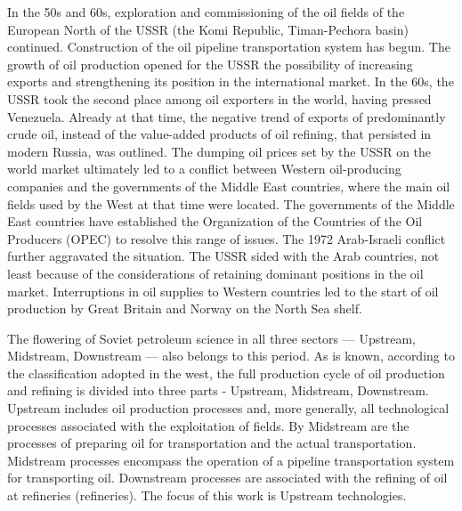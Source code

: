 \documentclass[12pt]{report}
\theoremstyle{definition}
\begin{document}
In the 50s and 60s, exploration and commissioning of the oil fields of the European North of the USSR (the Komi Republic, Timan-Pechora basin) continued.
Construction of the oil pipeline transportation system has begun.
The growth of oil production opened for the USSR the possibility of increasing exports and strengthening its position in the international market.
In the 60s, the USSR took the second place among oil exporters in the world, having pressed Venezuela.
Already at that time, the negative trend of exports of predominantly crude oil, instead of the value-added products of oil refining, that persisted in modern Russia, was outlined.
The dumping oil prices set by the USSR on the world market ultimately led to a conflict between Western oil-producing companies and the governments of the Middle East countries, where the main oil fields used by the West at that time were located.
The governments of the Middle East countries have established the Organization of the Countries of the Oil Producers (OPEC) to resolve this range of issues.
The 1972 Arab-Israeli conflict further aggravated the situation.
The USSR sided with the Arab countries, not least because of the considerations of retaining dominant positions in the oil market.
Interruptions in oil supplies to Western countries led to the start of oil production by Great Britain and Norway on the North Sea shelf.

The flowering of Soviet petroleum science in all three sectors — Upstream, Midstream, Downstream — also belongs to this period.
As is known, according to the classification adopted in the west, the full production cycle of oil production and refining is divided into three parts - Upstream, Midstream, Downstream.
Upstream includes oil production processes and, more generally, all technological processes associated with the exploitation of fields.
By Midstream are the processes of preparing oil for transportation and the actual transportation.
Midstream processes encompass the operation of a pipeline transportation system for transporting oil.
Downstream processes are associated with the refining of oil at refineries (refineries).
The focus of this work is Upstream technologies.
\end{document}
